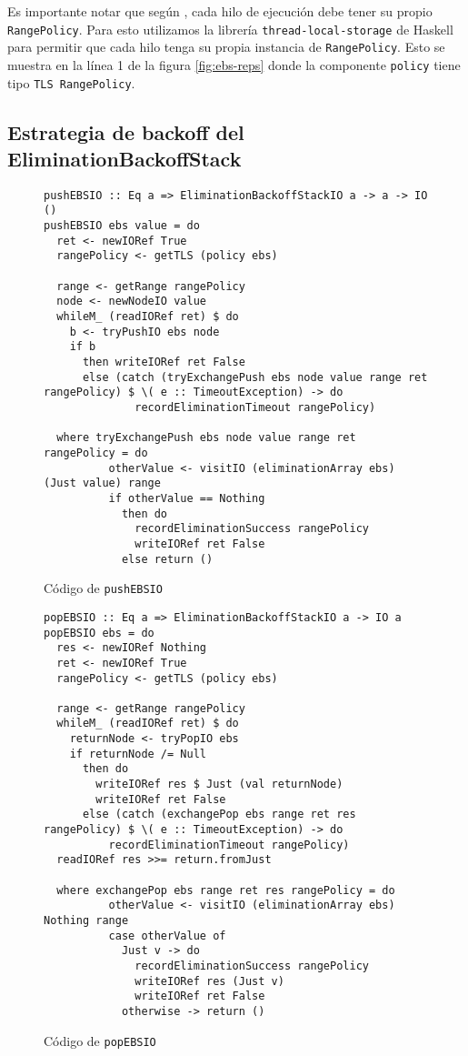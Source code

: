 Es importante notar que según \cite{shavit}, cada hilo de ejecución debe tener su propio \texttt{RangePolicy}. Para esto utilizamos la librería \texttt{thread-local-storage} \cite{tls-haskell} de Haskell para permitir que cada hilo tenga su propia instancia de \texttt{RangePolicy}. Esto se muestra en la línea 1 de la figura \ref{fig:ebs-reps} donde la componente \texttt{policy} tiene tipo \texttt{TLS RangePolicy}.

\subsection{Estrategia de backoff del EliminationBackoffStack}
\begin{figure}[t]
  \centering
  \begin{verbatim}
pushEBSIO :: Eq a => EliminationBackoffStackIO a -> a -> IO ()
pushEBSIO ebs value = do
  ret <- newIORef True
  rangePolicy <- getTLS (policy ebs)

  range <- getRange rangePolicy
  node <- newNodeIO value
  whileM_ (readIORef ret) $ do
    b <- tryPushIO ebs node
    if b
      then writeIORef ret False
      else (catch (tryExchangePush ebs node value range ret rangePolicy) $ \( e :: TimeoutException) -> do
              recordEliminationTimeout rangePolicy)

  where tryExchangePush ebs node value range ret rangePolicy = do
          otherValue <- visitIO (eliminationArray ebs) (Just value) range
          if otherValue == Nothing
            then do
              recordEliminationSuccess rangePolicy
              writeIORef ret False
            else return ()
  \end{verbatim}
  \caption{Código de \texttt{pushEBSIO}}
  \label{pushEBSIO-code}
\end{figure}

\begin{figure}[t]
\begin{verbatim}
popEBSIO :: Eq a => EliminationBackoffStackIO a -> IO a
popEBSIO ebs = do
  res <- newIORef Nothing
  ret <- newIORef True
  rangePolicy <- getTLS (policy ebs)

  range <- getRange rangePolicy
  whileM_ (readIORef ret) $ do
    returnNode <- tryPopIO ebs
    if returnNode /= Null
      then do
        writeIORef res $ Just (val returnNode)
        writeIORef ret False
      else (catch (exchangePop ebs range ret res rangePolicy) $ \( e :: TimeoutException) -> do
          recordEliminationTimeout rangePolicy)
  readIORef res >>= return.fromJust

  where exchangePop ebs range ret res rangePolicy = do
          otherValue <- visitIO (eliminationArray ebs) Nothing range
          case otherValue of
            Just v -> do
              recordEliminationSuccess rangePolicy
              writeIORef res (Just v)
              writeIORef ret False
            otherwise -> return ()
\end{verbatim}
  \caption{Código de \texttt{popEBSIO}}
  \label{popEBSIO-code}
\end{figure}

